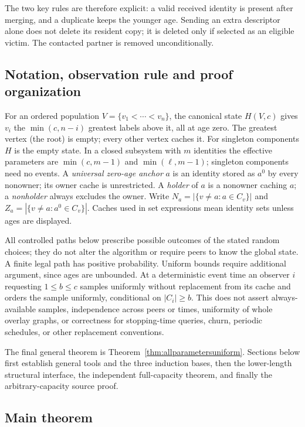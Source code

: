 \documentclass[11pt]{article}
\begin{document}
The two key rules are therefore explicit: a valid received
identity is present after merging, and a duplicate keeps the
younger age. Sending an extra descriptor alone does not delete
its resident copy; it is deleted only if selected as an eligible
victim. The contacted partner is removed unconditionally.




\subsection{Notation, observation rule and proof organization}
For an ordered population $V=\{v_1<\cdots<v_n\}$, the canonical state
$H(V,c)$ gives $v_i$ the $\min(c,n-i)$ greatest labels above it, all at
age zero. The greatest vertex (the root) is empty; every other vertex
caches it. For singleton components $H$ is the empty state. In a closed
subsystem with $m$ identities the effective parameters are
$\min(c,m-1)$ and $\min(\ell,m-1)$; singleton components need no events.
A \emph{universal zero-age anchor} $a$ is an identity stored as $a^0$
by every nonowner; its owner cache is unrestricted. A \emph{holder}
of $a$ is a nonowner caching $a$; a \emph{nonholder} always excludes
the owner. Write $N_a=|\{v\ne a:a\in C_v\}|$ and
$Z_a=|\{v\ne a:a^0\in C_v\}|$. Caches used in set expressions mean
identity sets unless ages are displayed.

All controlled paths below prescribe possible outcomes of the stated
random choices; they do not alter the algorithm or require peers to
know the global state. A finite legal path has positive probability.
Uniform bounds require additional argument, since ages are unbounded.
At a deterministic event time an observer $i$ requesting $1\le b\le c$
samples uniformly without replacement from its cache and orders the
sample uniformly, conditional on $|C_i|\ge b$. This does not assert
always-available samples, independence across peers or times, uniformity
of whole overlay graphs, or correctness for stopping-time queries,
churn, periodic schedules, or other replacement conventions.

The final general theorem is Theorem~\ref{thm:allparametersuniform}.
Sections below first establish general tools and the three induction
bases, then the lower-length structural interface, the independent
full-capacity theorem, and finally the arbitrary-capacity source proof.


\subsection{Main theorem}
\end{document}
